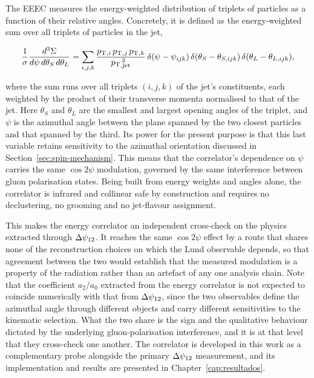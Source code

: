 The EEEC measures the energy-weighted distribution of
triplets of particles as a function of their relative angles. Concretely, it is
defined as the energy-weighted sum over all triplets of particles in the jet,

\begin{equation}
  \frac{1}{\sigma}\frac{d^3\Sigma}{d\psi\, d\theta_S\, d\theta_L}
  = \sum_{i,j,k}
  \frac{p_{\mathrm{T}}{}_{,i}\,p_{\mathrm{T}}{}_{,j}\,p_{\mathrm{T}}{}_{,k}}{p_{\mathrm{T}}{}_{,\text{jet}}^{\,3}}\,
  \delta(\psi - \psi_{ijk})\,
  \delta(\theta_S - \theta_{S,ijk})\,
  \delta(\theta_L - \theta_{L,ijk}),
  \label{eq:eeec}
\end{equation}

where the sum runs over all triplets $(i,j,k)$ of the jet's constituents, each
weighted by the product of their transverse momenta normalised to that of the
jet. Here $\theta_S$ and $\theta_L$ are the smallest and largest opening angles
of the triplet, and $\psi$ is the azimuthal angle between the plane spanned by
the two closest particles and that spanned by the third. Its power for the present
purpose is that this last variable retains sensitivity to the azimuthal
orientation discussed in Section~\ref{sec:spin-mechanism}. This means that the
correlator's dependence on $\psi$ carries the same $\cos 2\psi$ modulation, governed by the
same interference between gluon polarisation states. Being built from energy
weights and angles alone, the correlator is infrared and collinear safe by
construction and requires no declustering, no grooming and no jet-flavour
assignment.

This makes the energy correlator an independent cross-check on the physics
extracted through $\Delta\psi_{12}$. It reaches the same $\cos 2\psi$ effect by a route that
shares none of the reconstruction choices on which the Lund observable depends,
so that agreement between the two would establish that the measured modulation is a
property of the radiation rather than an artefact of any one analysis chain. 
Note that the coefficient $a_2/a_0$ extracted from the energy correlator is not expected to
coincide numerically with that from $\Delta\psi_{12}$, since the two observables define the
azimuthal angle through different objects and carry different sensitivities to the
kinematic selection. What the two share is the sign and the qualitative behaviour
dictated by the underlying gluon-polarisation interference, and it is at that
level that they cross-check one another.
The correlator is developed in this work as a complementary probe alongside the primary
$\Delta\psi_{12}$ measurement, and its implementation and results are presented in
Chapter~\ref{cap:resultados}.